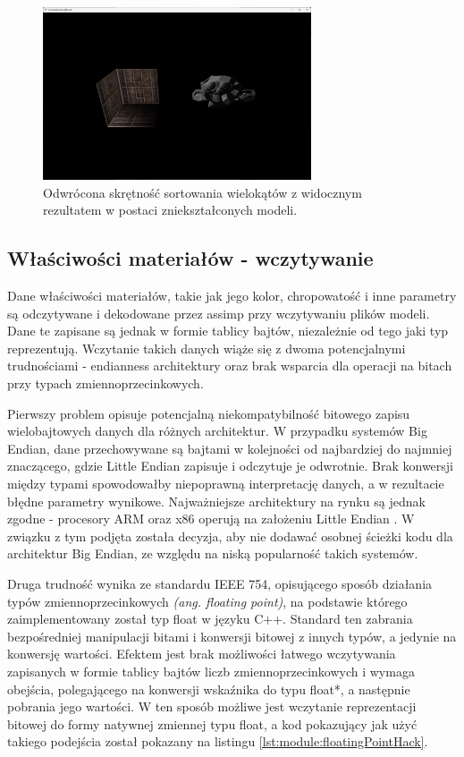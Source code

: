 \begin{figure}[h!]
	\centering
	\includegraphics[width=300px]{images/impl/3_inverted_handiness.png}
	\caption{Odwrócona skrętność sortowania wielokątów z widocznym rezultatem w postaci zniekształconych modeli.}
	\label{Impl_InvertedHandiness}
\end{figure}


\subsection{Właściwości materiałów - wczytywanie}
Dane właściwości materiałów, takie jak jego kolor, chropowatość i inne parametry są odczytywane i dekodowane przez assimp przy wczytywaniu plików modeli. Dane te zapisane są jednak w formie tablicy bajtów, niezależnie od tego jaki typ reprezentują. Wczytanie takich danych wiąże się z dwoma potencjalnymi trudnościami - endianness architektury oraz brak wsparcia dla operacji na bitach przy typach zmiennoprzecinkowych.

Pierwszy problem opisuje potencjalną niekompatybilność bitowego zapisu wielobajtowych danych dla różnych architektur. W przypadku systemów Big Endian, dane przechowywane są bajtami w kolejności od najbardziej do najmniej znaczącego, gdzie Little Endian zapisuje i odczytuje je odwrotnie. Brak konwersji między typami spowodowałby niepoprawną interpretację danych, a w rezultacie błędne parametry wynikowe. Najważniejsze architektury na rynku są jednak zgodne - procesory ARM oraz x86 operują na założeniu Little Endian \cite{ARM:Developer:Endianness} \cite{Oracle:HelpCenter:x86ByteOrdering}. W związku z tym podjęta została decyzja, aby nie dodawać osobnej ścieżki kodu dla architektur Big Endian, ze względu na niską popularność takich systemów.

Druga trudność wynika ze standardu IEEE 754, opisującego sposób działania typów zmiennoprzecinkowych \textit{(ang. floating point)}, na podstawie którego zaimplementowany został typ float w języku C++. Standard ten zabrania bezpośredniej manipulacji bitami i konwersji bitowej z innych typów, a jedynie na konwersję wartości. Efektem jest brak możliwości łatwego wczytywania zapisanych w formie tablicy bajtów liczb zmiennoprzecinkowych i wymaga obejścia, polegającego na konwersji wskaźnika do typu float*, a następnie pobrania jego wartości.  W ten sposób możliwe jest wczytanie reprezentacji bitowej do formy natywnej zmiennej typu float, a kod pokazujący jak użyć takiego podejścia został pokazany na listingu \ref{lst:module:floatingPointHack}.

